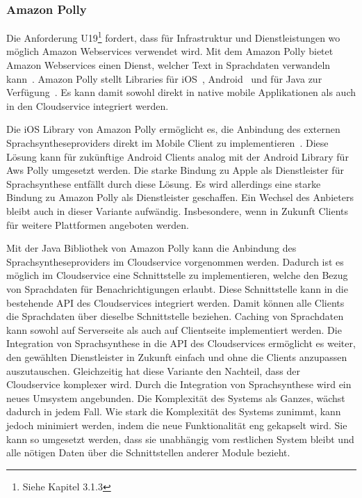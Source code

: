 \subsubsection{Amazon Polly}

Die Anforderung U19\footnote{Siehe Kapitel 3.1.3} fordert, dass für Infrastruktur und Dienstleistungen wo möglich Amazon Webservices verwendet wird.
Mit dem Amazon Polly bietet Amazon Webservices einen Dienst, welcher Text in Sprachdaten verwandeln kann~\cite{aws_polly}.
Amazon Polly stellt Libraries für iOS~\cite{aws_polly_ios}, Android~\cite{aws_polly_sdks} und für Java zur Verfügung~\cite{aws_polly_java}.
Es kann damit sowohl direkt in native mobile Applikationen als auch in den Cloudservice integriert werden.

Die iOS Library von Amazon Polly ermöglicht es, die Anbindung des externen Sprachsyntheseproviders direkt im Mobile Client zu implementieren~\cite{aws_polly_ios}.
Diese Lösung kann für zukünftige Android Clients analog mit der Android Library für Aws Polly umgesetzt werden.
Die starke Bindung zu Apple als Dienstleister für Sprachsynthese entfällt durch diese Lösung.
Es wird allerdings eine starke Bindung zu Amazon Polly als Dienstleister geschaffen.
Ein Wechsel des Anbieters bleibt auch in dieser Variante aufwändig.
Insbesondere, wenn in Zukunft Clients für weitere Plattformen angeboten werden.

Mit der Java Bibliothek von Amazon Polly kann die Anbindung des Sprachsyntheseproviders im Cloudservice vorgenommen werden.
Dadurch ist es möglich im Cloudservice eine Schnittstelle zu implementieren, welche den Bezug von Sprachdaten für Benachrichtigungen erlaubt.
Diese Schnittstelle kann in die bestehende API des Cloudservices integriert werden.
Damit können alle Clients die Sprachdaten über dieselbe Schnittstelle beziehen.
Caching von Sprachdaten kann sowohl auf Serverseite als auch auf Clientseite implementiert werden.
Die Integration von Sprachsynthese in die API des Cloudservices ermöglicht es weiter, den gewählten Dienstleister in Zukunft einfach und ohne die Clients anzupassen auszutauschen.
Gleichzeitig hat diese Variante den Nachteil, dass der Cloudservice komplexer wird.
Durch die Integration von Sprachsynthese wird ein neues Umsystem angebunden.
Die Komplexität des Systems als Ganzes, wächst dadurch in jedem Fall.
Wie stark die Komplexität des Systems zunimmt, kann jedoch minimiert werden, indem die neue Funktionalität eng gekapselt wird.
Sie kann so umgesetzt werden, dass sie unabhängig vom restlichen System bleibt und alle nötigen Daten über die Schnittstellen anderer Module bezieht.

